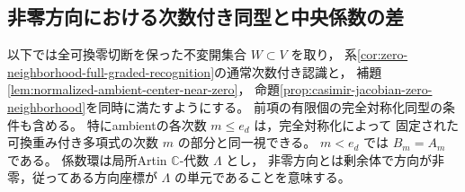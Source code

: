 \subsection{非零方向における次数付き同型と中央係数の差}

以下では全可換零切断を保った不変開集合 $W\subset V$ を取り，
系\ref{cor:zero-neighborhood-full-graded-recognition}の通常次数付き認識と，
補題\ref{lem:normalized-ambient-center-near-zero}，
命題\ref{prop:casimir-jacobian-zero-neighborhood}を同時に満たすようにする。
前項の有限個の完全対称化同型の条件も含める。
特にambientの各次数 $m\le e_d$ は，完全対称化によって
固定された可換重み付き多項式の次数 $m$ の部分と同一視できる。
$m<e_d$ では $B_m=A_m$ である。
係数環は局所Artin $\mathbb C$-代数 $\Lambda$ とし，
非零方向とは剰余体で方向が非零，従ってある方向座標が $\Lambda$ の単元であることを意味する。

